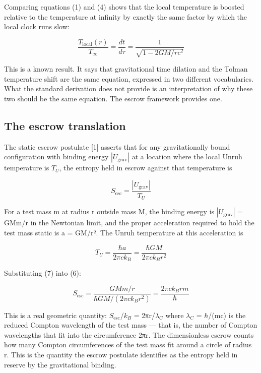 \documentclass[11pt]{article}
\begin{document}
Comparing equations (1) and (4) shows that the local temperature is
boosted relative to the temperature at infinity by exactly the same
factor by which the local clock runs slow:

\begin{equation}
  \frac{T_{\mathrm{local}}(r)}{T_{\infty}} = \frac{dt}{d\tau} = \frac{1}{\sqrt{1 - 2GM/rc^{2}}}
  \label{eq:5}
\end{equation}

This is a known result. It says that gravitational time dilation and the
Tolman temperature shift are the same equation, expressed in two
different vocabularies. What the standard derivation does not provide is
an interpretation of why these two should be the same equation. The
escrow framework provides one.


\subsection{The escrow translation}

The static escrow postulate [1] asserts that for any gravitationally
bound configuration with binding energy $|U_{\mathrm{grav}}|$ at a location where
the local Unruh temperature is $T_{U}$, the entropy held in escrow against
that temperature is

\begin{equation}
  S_{\mathrm{esc}} = \frac{|U_{\mathrm{grav}}|}{T_{U}}
  \label{eq:6}
\end{equation}

For a test mass m at radius r outside mass M, the binding energy is
$|U_{\mathrm{grav}}|$ = GMm/r in the Newtonian limit, and the proper acceleration
required to hold the test mass static is a = GM/r². The Unruh
temperature at this acceleration is

\begin{equation}
  T_{U} = \frac{\hbar a}{2\pi c k_{B}} = \frac{\hbar GM}{2\pi c k_{B} r^{2}}
  \label{eq:7}
\end{equation}

Substituting (7) into (6):

\begin{equation}
  S_{\mathrm{esc}} = \frac{GMm/r}{\hbar GM/(2\pi c k_{B} r^{2})} = \frac{2\pi c k_{B} r m}{\hbar}
  \label{eq:8}
\end{equation}

This is a real geometric quantity: $S_{\mathrm{esc}}$/$k_{B}$ = 2πr/$\lambda_{C}$ where $\lambda_{C}$ =
$\hbar$/(mc) is the reduced Compton wavelength of the test mass --- that is,
the number of Compton wavelengths that fit into the circumference 2πr.
The dimensionless escrow counts how many Compton circumferences of the
test mass fit around a circle of radius r. This is the quantity the
escrow postulate identifies as the entropy held in reserve by the
gravitational binding.
\end{document}
